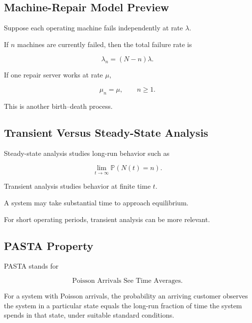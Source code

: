 \subsection{Machine-Repair Model Preview}
\label{subsec:machine-repair-model}

Suppose each operating machine fails independently at rate \(\lambda\).

If \(n\) machines are currently failed, then the total failure rate is

\[
\boxed{
\lambda_n
=
(N-n)\lambda.
}
\]

If one repair server works at rate \(\mu\),

\[
\boxed{
\mu_n
=
\mu,
\qquad
n\geq1.
}
\]

This is another birth--death process.

\subsection{Transient Versus Steady-State Analysis}
\label{subsec:transient-steady-state-queueing}

Steady-state analysis studies long-run behavior such as

\[
\boxed{
\lim_{t\to\infty}
\mathbb{P}
(
N(t)=n
).
}
\]

Transient analysis studies behavior at finite time \(t\).

A system may take substantial time to approach equilibrium.

For short operating periods, transient analysis can be more relevant.

\subsection{PASTA Property}
\label{subsec:pasta-property}

PASTA stands for

\[
\boxed{
\text{Poisson Arrivals See Time Averages}.
}
\]

For a system with Poisson arrivals, the probability an arriving customer
observes the system in a particular state equals the long-run fraction of
time the system spends in that state, under suitable standard conditions.

